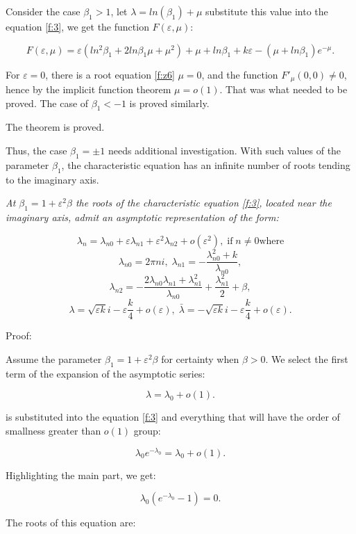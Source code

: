 \documentclass[12pt]{article} %
\newcommand{\eps}{\varepsilon}
\begin{document}
Consider the case $\beta_1>1$, let $\lambda=ln(\beta_1)+\mu$ substitute this value into the equation \eqref{f:3}, we get the function $F(\eps,\mu)$:

\begin{equation}
F(\eps,\mu)=\eps(ln^2\beta_1+2ln\beta_1\mu+\mu^2)+\mu+ln\beta_1+k\eps-(\mu+ln\beta_1)e^{-\mu}.
\label{f:z6}
\end{equation}


For $\eps=0$, there is a root equation \eqref{f:z6} $\mu=0$, and the function $F'_\mu(0,0)\neq 0$, hence by the implicit function theorem $\mu=o(1)$. That was what needed to be proved. The case of $\beta_1<-1$ is proved similarly.

The theorem is proved.


Thus, the case $\beta_1=\pm1$ needs additional investigation. With such values of the parameter $\beta_1$, the characteristic equation has an infinite number of roots tending to the imaginary axis.



 {\sl At \(\beta_1=1+\eps^2\beta\) the roots of the characteristic equation \eqref{f:3}, located near the imaginary axis, admit an asymptotic representation of the form:}


\[
\lambda_n=\lambda_{n0}+ \varepsilon\lambda_{n1}+\varepsilon^{2}\lambda_{n2}+o(\varepsilon^{2}),\;\text{if}\;n\neq0\text {where}
\]
\[
\lambda_{n0}=2\pi ni,\;
\lambda_{n1}=-\frac{\lambda_{n0}^{2}+k}{\lambda_{n0}},
\]
\[
\lambda_{n2}=-\frac{2\lambda_{n0}\lambda_{n1}+\lambda_{n1}^2}{\lambda_{n0}}+\frac{\lambda_{n1}^2}{2}+\beta,
\]
\[
\lambda= \sqrt{\varepsilon k}i-\varepsilon\frac{k}{4}+o(\varepsilon),\;
\bar{\lambda}= -\sqrt{\varepsilon k}i-\varepsilon\frac{k}{4}+o(\varepsilon).
\]

Proof:

Assume the parameter \(\beta_1=1+\eps^2\beta\) for certainty when $\beta>0$. We select the first term of the expansion of the asymptotic series:

\[
\lambda=\lambda_{0}+o(1).
\]

\noindent is substituted into the equation \eqref{f:3} and everything that will have the order of smallness greater than \(o(1)\) group:

\[
\lambda_{0}e^{-\lambda_{0}}=\lambda_{0}+o(1).
\]

Highlighting the main part, we get:

\[
\lambda_{0} (e^{-\lambda_{0}}-1)=0.
\]

The roots of this equation are:
\end{document}
